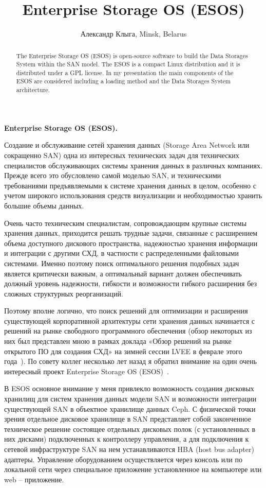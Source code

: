 \documentclass[10pt, a5paper]{article}
\begin{document}
\title{Enterprise Storage OS (ESOS)}
\author{Александр Клыга, Minsk, Belarus}
\maketitle
\begin{abstract}
The Enterprise Storage OS (ESOS) is open-source software to build the Data Storages System within the SAN model. The ESOS is a compact Linux distribution and it is distributed under a GPL license. In my presentation the main components of the ESOS are considered including a loading method and the Data Storages System architecture.
\end{abstract}
\textbf{Enterprise Storage OS (ESOS).}

Создание и обслуживание сетей хранения данных (Storage Area Network или сокращенно SAN) одна из интересных технических задач для технических специалистов обслуживающих системы хранения данных в различных компаниях. Прежде всего это обусловлено самой моделью SAN, и техническими требованиями предъявляемыми к системе хранения данных в целом, особенно с учетом широкого использования средств визуализации и необходимостью хранить большие объемы данных.

Очень часто техническим специалистам, сопровождающим крупные системы хранения данных, приходится решать трудные задачи, связанные с расширением объема доступного дискового пространства, надежностью хранения информации и интеграции с другими СХД, в частности с распределенными файловыми системами. Именно поэтому поиск оптимального решения подобных задач является критически важным, а оптимальный вариант должен обеспечивать должный уровень надежности, гибкости и возможности гибкого расширения без сложных структурных реорганизаций.

Поэтому вполне логично, что поиск решений для оптимизации и расширения существующей корпоративной архитектуры сети хранения данных начинается с решений на рынке свободного программного обеспечения (обзор некоторых из них был представлен мною в рамках доклада «Обзор решений на рынке открытого ПО для создания СХД» на зимней сессии LVEE в феврале этого года~\cite{Kliga1}). По совету коллег несколько лет назад я обратил внимание на один очень интересный проект  Enterprise Storage OS (ESOS)~\cite{Kliga2}.

В ESOS основное внимание у меня привлекло возможность создания дисковых хранилищ для систем хранения данных модели SAN и возможности интеграции существующей SAN в объектное хранилище данных Ceph. 
С физической точки зрения отдельное дисковое хранилище в SAN представляет собой законченное техническое решение состоящее отдельных дисковых полок (с установленных в них дисками)  подключенных к контроллеру управления, а для подключения к сетевой инфраструктуре SAN  на нем устанавливаются HBA (host bus adapter) адаптеры. Управление оборудованием осуществляется через консоль или по локальной сети через специальное приложение установленное на компьютере или web – приложение.
\end{document}
